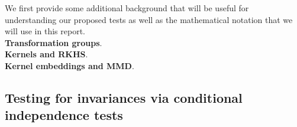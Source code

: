We first provide some additional background that will be useful for understanding our proposed tests as well as the mathematical notation that we will use in this report.
\\

\textbf{Transformation groups}. \todo
\\

\textbf{Kernels and RKHS}. \todo
\\

\textbf{Kernel embeddings and MMD}. \todo


\subsection{Testing for invariances via conditional independence tests} \label{sec:condind}


